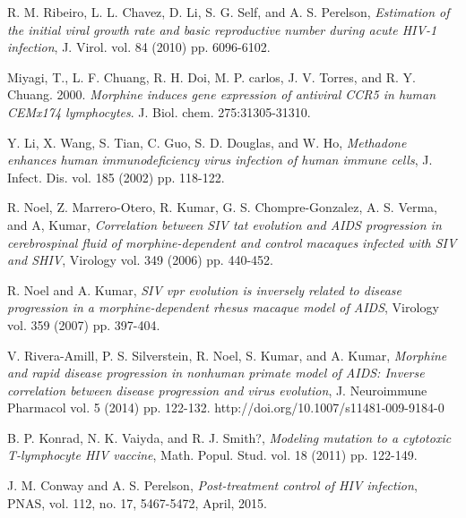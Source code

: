 \documentclass[11pt, oneside]{article}    %
\begin{document}
\begin{thebibliography}{99}
R. M. Ribeiro, L. L. Chavez, D. Li, S. G. Self, and A. S. Perelson, {\em Estimation of the initial viral growth rate and basic reproductive number during acute HIV-1 infection}, J. Virol. vol. 84 (2010) pp. 6096-6102.



Miyagi, T., L. F. Chuang, R. H. Doi, M. P. carlos, J. V. Torres, and R. Y. Chuang. 2000. {\em Morphine induces gene expression of antiviral CCR5 in human CEMx174 lymphocytes}. J. Biol. chem. 275:31305-31310.

Y. Li, X. Wang, S. Tian, C. Guo, S. D. Douglas, and W. Ho, {\em Methadone enhances human immunodeficiency virus infection of human immune cells}, J. Infect. Dis. vol. 185 (2002) pp. 118-122.

R. Noel, Z. Marrero-Otero, R. Kumar, G. S. Chompre-Gonzalez, A. S. Verma, and A, Kumar,  {\em Correlation between SIV tat evolution and AIDS progression in cerebrospinal fluid of morphine-dependent and control macaques infected with SIV and SHIV}, Virology vol. 349 (2006) pp. 440-452.

R. Noel and A. Kumar, {\em SIV vpr evolution is inversely related to disease progression in a morphine-dependent rhesus macaque model of AIDS}, Virology vol. 359 (2007) pp. 397-404.

V. Rivera-Amill, P. S. Silverstein, R. Noel, S. Kumar, and A. Kumar,  {\em Morphine and rapid disease progression in nonhuman primate model of AIDS: Inverse correlation between disease progression and virus evolution}, J. Neuroimmune Pharmacol vol. 5 (2014) pp. 122-132. http://doi.org/10.1007/s11481-009-9184-0

B. P. Konrad, N. K. Vaiyda, and R. J. Smith?, {\em Modeling mutation to a cytotoxic T-lymphocyte HIV vaccine}, Math. Popul. Stud. vol. 18 (2011) pp. 122-149.

J. M. Conway and A. S. Perelson, {\em Post-treatment control of HIV infection}, PNAS, vol. 112, no. 17, 5467-5472, April, 2015.


\end{thebibliography}
\end{document}
